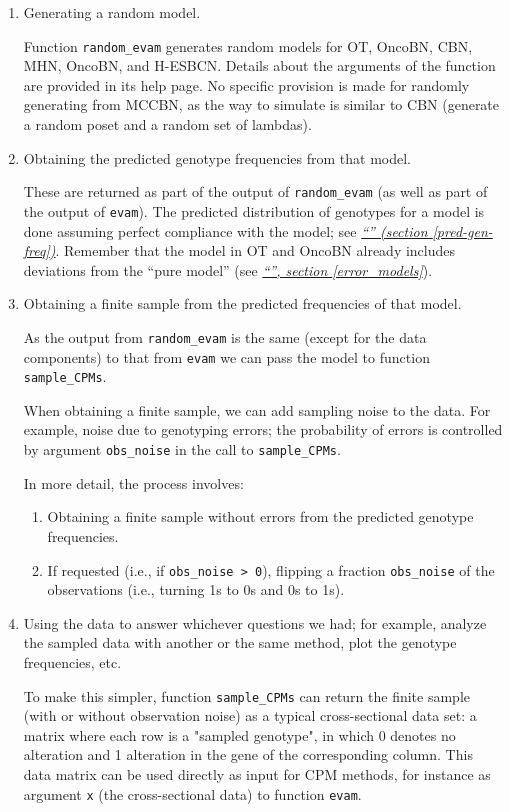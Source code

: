 \documentclass[a4paper,11pt]{article}
\newcommand*{\qref}[1]{\hyperref[{#1}]{\textit{``\nameref*{#1}'' (section \ref*{#1})}}}
\newcommand*{\qrefP}[1]{\hyperref[{#1}]{\textit{``\nameref*{#1}'', section \ref*{#1}}}}
\begin{document}
\begin{enumerate}
\item Generating a random model.
  
  Function \texttt{random\_evam} generates random models for OT, OncoBN, CBN, MHN, OncoBN, and H-ESBCN. Details about the arguments of the function are provided in its help page. No specific provision is made for randomly generating from MCCBN, as the way to simulate is similar to CBN (generate a random poset and a random set of lambdas).

\item Obtaining the predicted genotype frequencies from that model.
  
  These are returned as part of the output of \texttt{random\_evam} (as well as part of the output of \texttt{evam}).  The predicted distribution of genotypes for a model is done assuming perfect compliance with the model; see \qref{pred-gen-freq}. Remember that the model in OT and OncoBN already includes deviations from the ``pure model'' (see \qrefP{error_models}).

\item Obtaining a finite sample from the predicted frequencies of that model.

  As the output from \texttt{random\_evam} is the same (except for the data components) to that from \texttt{evam} we can pass the model to function \texttt{sample\_CPMs}.

  When obtaining a finite sample, we can add sampling noise to the data. For example, noise due to genotyping errors; the probability of errors is controlled by argument \texttt{obs\_noise} in the call to \texttt{sample\_CPMs}.

  In more detail, the process involves:
  \begin{enumerate}
  \item Obtaining a finite sample without errors from the predicted genotype frequencies.
  \item If requested (i.e., if \texttt{obs\_noise > 0}), flipping a fraction \texttt{obs\_noise} of the observations (i.e., turning 1s to 0s and 0s to 1s).
  \end{enumerate}
  
\item Using the data to answer whichever questions we had; for example, analyze the sampled data with another or the same method, plot the genotype frequencies, etc.

  To make this simpler, function \texttt{sample\_CPMs} can return the finite sample (with or without observation noise) as a typical cross-sectional data set: a matrix where each row is a "sampled genotype", in which 0 denotes no alteration and 1 alteration in the gene of the corresponding column. This data matrix can be used directly as input for CPM methods, for instance as argument \texttt{x} (the cross-sectional data) to function \texttt{evam}.

  
\end{enumerate}
\end{document}
